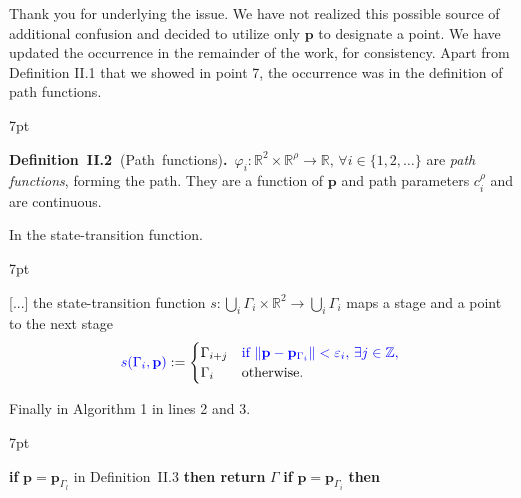 \documentclass[10pt]{letter}
\newenvironment{formal}{%
  \def\FrameCommand{%
    \hspace{1pt}%
    {\color{red}\vrule width 2pt}%
    {\color{formalshade}\vrule width 4pt}%
    \colorbox{formalshade}%
  }%
  \MakeFramed{\advance\hsize-\width\FrameRestore}%
  \noindent\hspace{-4.55pt}%
  \begin{adjustwidth}{}{7pt}%
  \vspace{2pt}\vspace{2pt}%
}
{%
  \vspace{2pt}\end{adjustwidth}\endMakeFramed%
}
\DeclarePairedDelimiter\norm{\lVert}{\rVert}%
\begin{document}
{\color{blue} 

{\hspace*{-4.5em}{[R1:10]}\vspace*{-1.9em}}

Thank you for underlying the issue. We have not realized this possible source of additional confusion and decided to utilize only $\mathbf{p}$ to designate a point. We have updated the occurrence in the remainder of the work, for consistency. Apart from Definition II.1 that we showed in point 7, the occurrence was in the definition of path functions.

\begin{formal}
  \color{black}
  \textbf{Definition~II.2~}(Path~functions)\textbf{.}~$\varphi_i:\mathbb{R}^2\times\mathbb{R}^\rho\rightarrow\mathbb{R},\,\forall i\in\{1,2,\dots\}
  $ are \emph{path functions}, forming the path. They are a function of {\color{blue}$\mathbf{p}%
  $} and path parameters $c_i^\rho%
  $ and are continuous.
  \vspace*{1ex}
\end{formal}

In the state-transition function.

\begin{formal}
  \color{black}
  [...] the state-transition function $s:\bigcup_i{\Gamma_i}\times\mathbb{R}^2\rightarrow\bigcup_i{\Gamma_i}$ maps a stage and a point to the next stage
  \begin{equation*}{\color{blue}s(\Gamma_i,\mathbf{p}%
    )}:=\begin{cases}
    \Gamma_{i+j} & {\color{blue}\text{if }\norm{\mathbf{p}%
    -\mathbf{p}_{\Gamma_i}}<\varepsilon_i,\,\exists j\in\mathbb{Z},}\\
    \Gamma_i & \text{otherwise}.
  \end{cases}\end{equation*}
\end{formal}

Finally in Algorithm 1 in lines 2 and 3.

\begin{formal}
  \begin{algorithmic}[1]
    \small
      \makeatletter
      \setcounter{ALC@line}{1}
      \makeatother
      \STATE \textbf{if} $\mathbf{p}%
      =\mathbf{p}_{\Gamma_l}${ in Definition~{\color{red}II.3}} \textbf{then return }$\Gamma$\vspace*{.3ex}
      \vspace*{.8ex}
      \STATE \textbf{if} $\mathbf{p}%
      =\mathbf{p}_{\Gamma_i}$ \textbf{then}
    \end{algorithmic}
  \end{formal}  

}
\end{document}
